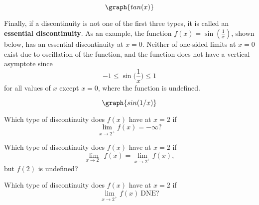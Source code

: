 \documentclass{ximera}
\begin{document}
\[
\graph{tan(x)}
\]




Finally, if a discontinuity is not one of the first three types, it is called an 
\textbf{essential discontinuity}.
As an example, the function $f(x) = \sin(\frac{1}{x})$, shown below, has an essential discontinuity at $x = 0$.
Neither of one-sided limits at $x=0$ exist due to oscillation of the function, 
and the function does not have a vertical asymptote since 
\[-1 \leq \sin\big(\frac{1}{x}\big) \leq 1 \]
for all values of $x$ except $x = 0$, where the function is undefined.

\[
\graph{sin(1/x)}
\]




\begin{problem} %
Which type of discontinuity does $f(x)$ have at $x=2$ if
\[
\lim_{x \to 2^+} f(x) = -\infty?
\]

\begin{multipleChoice}
\end{multipleChoice}
\end{problem}

\begin{problem} %
Which type of discontinuity does $f(x)$ have at $x=2$ if
\[
\lim_{x \to 2^-} f(x) = \lim_{x \to 2^+} f(x),
\]
but $f(2)$ is undefined?
\begin{multipleChoice}
\end{multipleChoice}
\end{problem}

\begin{problem} %
Which type of discontinuity does $f(x)$ have at $x=2$ if
\[
\lim_{x \to 2^+} f(x) \ \text{DNE}?
\]

\begin{multipleChoice}
\end{multipleChoice}
\end{problem}
\end{document}
